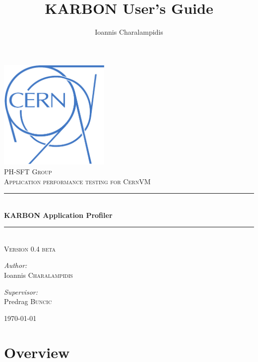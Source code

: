 \documentclass[12pt,a4paper]{scrreprt}
\author{Ioannis Charalampidis}
\title{KARBON User's Guide}
\newcommand{\HRule}{\rule{\linewidth}{0.5mm}}
\begin{document}
\begin{titlepage}
\begin{center}
	\includegraphics[width=0.4\textwidth]{cernlogo.pdf}\\[1cm]    

	\textsc{\LARGE PH-SFT Group}\\[1.5cm]
	\textsc{\Large Application performance testing for CernVM}\\[0.5cm]

	\HRule \\[0.4cm] { 
		\huge \bfseries KARBON Application Profiler
		}\\[0.4cm]
	\HRule \\[0.4cm]
	
	\textsc{Version 0.4 beta}\\[1.5cm]

	\begin{minipage}{0.4\textwidth}
		\begin{flushleft} 
			\large\emph{Author:}\\
			Ioannis \textsc{Charalampidis}
		\end{flushleft}
	\end{minipage}
	\begin{minipage}{0.4\textwidth}
		\begin{flushright} \large
			\emph{Supervisor:} \\
			Predrag \textsc{Buncic}
		\end{flushright}
	\end{minipage}

	\vfill

	{\large \today}
\end{center}
\end{titlepage}


\tableofcontents
\newpage

\chapter{Overview}
\end{document}
